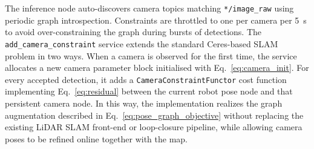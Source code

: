 The inference node auto-discovers camera topics matching
\texttt{*/image\_raw} using periodic graph introspection.
Constraints are throttled to one per camera per \SI{5}{\second} to avoid
over-constraining the graph during bursts of detections.
The \texttt{add\_camera\_constraint} service extends the standard
Ceres-based SLAM problem in two ways.
When a camera is observed for the first time, the service allocates a new
camera parameter block initialised with Eq.~\ref{eq:camera_init}.
For every accepted detection, it adds a
\texttt{CameraConstraintFunctor} cost function implementing
Eq.~\ref{eq:residual} between the current robot pose node and that persistent
camera node.
In this way, the implementation realizes the graph augmentation described in
Eq.~\ref{eq:pose_graph_objective} without replacing the existing LiDAR SLAM
front-end or loop-closure pipeline, while allowing camera poses to be refined
online together with the map.

